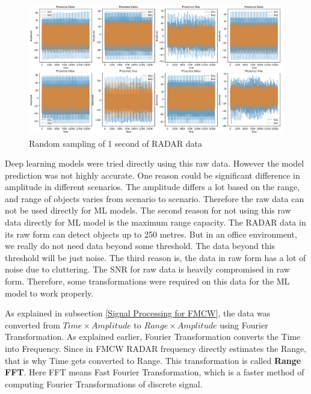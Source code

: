 \begin{figure}[ht]
  \begin{center}
    \includegraphics[width=01\textwidth]{Master's thesis/images/raw_signal.PNG} 
    \caption{Random sampling of 1 second of RADAR data}
    \label{fig:raw_signal}
  \end{center}
\end{figure}  

Deep learning models were tried directly using this raw data. However the model prediction was not highly accurate. One reason could be significant difference in amplitude in different scenarios. The amplitude differs a lot based on the range, and range of objects varies from scenario to scenario. Therefore the raw data can not be used directly for ML models. The second reason for not using this raw data directly for ML model is the maximum range capacity. The RADAR data in its raw form can detect objects up to 250 metres. But in an office environment, we really do not need data beyond some threshold. The data beyond this threshold will be just noise. The third reason is, the data in raw form has a lot of noise due to cluttering. The SNR for raw data is heavily compromised in raw form. Therefore, some transformations were required on this data for the ML model to work properly.

As explained in subsection \ref{Signal Processing for FMCW}, the data was converted from $Time\times Amplitude$ to $Range\times Amplitude$ using Fourier Transformation. As explained earlier, Fourier Transformation converts the Time into Frequency. Since in FMCW RADAR frequency directly estimates the Range, that is why Time gets converted to Range. This transformation is called \textbf{Range FFT}. Here FFT means Fast Fourier Transformation, which is a faster method of computing Fourier Transformations of discrete signal.

